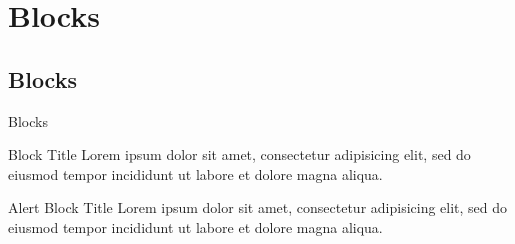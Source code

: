 \section{Blocks}
\subsection{Blocks}
\label{blocks}
\begin{frame}{Blocks}
  \begin{block}{Block Title}
    Lorem ipsum dolor sit amet, consectetur adipisicing elit, sed do eiusmod tempor incididunt ut labore et dolore magna aliqua.
  \end{block}
  \begin{alertblock}{Alert Block Title}
    Lorem ipsum dolor sit amet, consectetur adipisicing elit, sed do eiusmod tempor incididunt ut labore et dolore magna aliqua.
  \end{alertblock}
\end{frame}
